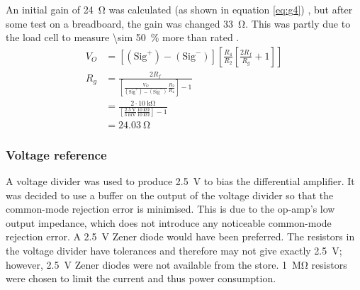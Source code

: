 \documentclass[twoside]{article}
\newcommand\ddfrac[2]{\frac{\displaystyle #1}{\displaystyle #2}}
\begin{document}
        An initial gain of \SI{24}{\ohm} was calculated (as shown in equation \eqref{eq:g4}) \cite{ti:sloa034}, but after some test on a breadboard, the gain was changed \SI{33}{\ohm}. This was partly due to the load cell to measure \SI{\sim 50}{\percent} more than rated \cite{htc:tal221}.
        \begin{align}
            V_{O} &= \left[ \left(\text{Sig}^{+}\right) - \left(\text{Sig}^{-}\right)\right]\left[\frac{R_{4}}{R_{2}} \left[\frac{2R_{f}}{R_{g}} + 1\right] \right] \label{eq:g1}\\
            R_{g} &= \ddfrac{2R_{f}}{\left[\frac{V_{O}}{\left(\text{Sig}^{+}\right) - \left(\text{Sig}^{-}\right)} \frac{R_{2}}{R_{4}} \right]-1} \label{eq:g2}\\
            &= \ddfrac{2 \cdot \SI{10}{\kilo\ohm}}{\left[\frac{\SI{2.5}{\volt}}{\SI{3}{\milli\volt}} \frac{\SI{10}{\kilo\ohm}}{\SI{10}{\kilo\ohm}} \right]-1} \label{eq:g3}\\
            &= \SI{24.03}{\ohm} \label{eq:g4}
        \end{align}

        \subsubsection{Voltage reference}
        A voltage divider was used to produce \SI{2.5}{\volt} to bias the differential amplifier. It was decided to use a buffer on the output of the voltage divider so that the common-mode rejection error is minimised. This is due to the op-amp's low output impedance, which does not introduce any noticeable common-mode rejection error. A \SI{2.5}{\volt} Zener diode would have been preferred. The resistors in the voltage divider have tolerances and therefore may not give exactly \SI{2.5}{\volt}; however, \SI{2.5}{\volt} Zener diodes were not available from the store. \SI{1}{\mega\ohm} resistors were chosen to limit the current and thus power consumption.
\end{document}
